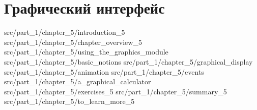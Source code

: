 \chapter{Графический интерфейс}
\label{chpt:the_graphics_interface}

 {src/part_1/chapter_5/introduction_5}
 {src/part_1/chapter_5/chapter_overview_5}
 {src/part_1/chapter_5/using_the_graphics_module}
 {src/part_1/chapter_5/basic_notions}
 {src/part_1/chapter_5/graphical_display}
 {src/part_1/chapter_5/animation}
 {src/part_1/chapter_5/events}
 {src/part_1/chapter_5/a_graphical_calculator}
 {src/part_1/chapter_5/exercises_5}
 {src/part_1/chapter_5/summary_5}
 {src/part_1/chapter_5/to_learn_more_5}